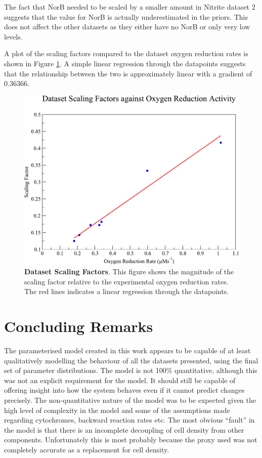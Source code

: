 The fact that NorB needed to be scaled by a smaller amount in Nitrite dataset 2 suggests that the value for NorB is actually underestimated in the priors. This does not affect the other datasets as they either have no NorB or only very low levels.

A plot of the scaling factors compared to the dataset oxygen reduction rates is shown in Figure \ref{fig:scaling-factors}. A simple linear regression through the datapoints suggests that the relationship between the two is approximately linear with a gradient of $0.36366$.

\begin{figure}[tbp]
 \centering
 \includegraphics[width=15cm, clip=true]{./09-completedmodel/data/scaling.pdf}
 \caption[Dataset Scaling Factors]{{\bf Dataset Scaling Factors}. This figure shows the magnitude of the scaling factor relative to the experimental oxygen reduction rates. The red lines indicates a linear regression through the datapoints.
 \label{fig:scaling-factors}}
\end{figure}

\section{Concluding Remarks}
The parameterised model created in this work appears to be capable of at least qualitatively modelling the behaviour of all the datasets presented, using the final set of parameter distributions. The model is not 100\% quantitative, although this was not an explicit requirement for the model. It should still be capable of offering insight into how the system behaves even if it cannot predict changes precisely. The non-quantitative nature of the model was to be expected given the high level of complexity in the model and some of the assumptions made regarding cytochromes, backward reaction rates etc. The most obvious ``fault'' in the model is that there is an incomplete decoupling of cell density from other components. Unfortunately this is most probably because the proxy used was not completely accurate as a replacement for cell density.

